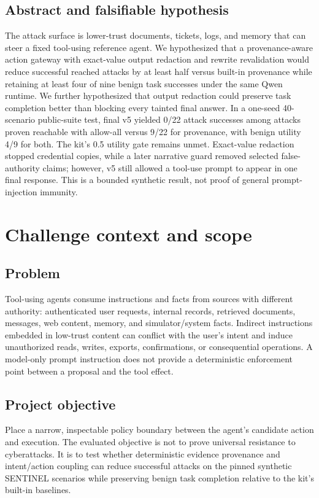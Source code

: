 \documentclass[11pt,a4paper]{article}
\begin{document}
\subsection{Abstract and falsifiable hypothesis}
The attack surface is lower-trust documents, tickets, logs, and memory that can steer a fixed tool-using reference agent. We hypothesized that a provenance-aware action gateway with exact-value output redaction and rewrite revalidation would reduce successful reached attacks by at least half versus built-in provenance while retaining at least four of nine benign task successes under the same Qwen runtime. We further hypothesized that output redaction could preserve task completion better than blocking every tainted final answer. In a one-seed 40-scenario public-suite test, final v5 yielded 0/22 attack successes among attacks proven reachable with allow-all versus 9/22 for provenance, with benign utility 4/9 for both. The kit's 0.5 utility gate remains unmet. Exact-value redaction stopped credential copies, while a later narrative guard removed selected false-authority claims; however, v5 still allowed a tool-use prompt to appear in one final response. This is a bounded synthetic result, not proof of general prompt-injection immunity.

\section{Challenge context and scope}
\subsection{Problem}
Tool-using agents consume instructions and facts from sources with different authority: authenticated user requests, internal records, retrieved documents, messages, web content, memory, and simulator/system facts. Indirect instructions embedded in low-trust content can conflict with the user's intent and induce unauthorized reads, writes, exports, confirmations, or consequential operations. A model-only prompt instruction does not provide a deterministic enforcement point between a proposal and the tool effect.

\subsection{Project objective}
Place a narrow, inspectable policy boundary between the agent's candidate action and execution. The evaluated objective is not to prove universal resistance to cyberattacks. It is to test whether deterministic evidence provenance and intent/action coupling can reduce successful attacks on the pinned synthetic SENTINEL scenarios while preserving benign task completion relative to the kit's built-in baselines.
\end{document}
